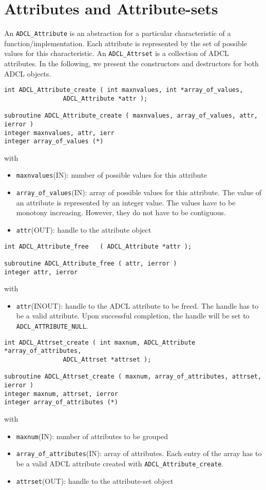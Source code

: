 \section{Attributes and Attribute-sets}

An {\tt ADCL\_Attribute} is an abstraction for a particular characteristic of a function/implementation. Each attribute is represented by the set of possible values for this characteristic.  An {\tt ADCL\_Attrset} is a collection of ADCL attributes.
In the following, we present the constructors and destructors for both ADCL objects.

\begin{verbatim}
int ADCL_Attribute_create ( int maxnvalues, int *array_of_values, 
			    ADCL_Attribute *attr );

subroutine ADCL_Attribute_create ( maxnvalues, array_of_values, attr, ierror )
integer maxnvalues, attr, ierr
integer array_of_values (*)
\end{verbatim}
with
\begin{itemize}
\item {\tt maxnvalues}(IN): number of possible values for this attribute
\item {\tt array\_of\_values}(IN): array of possible values for this attribute. The 
	value of an attribute is represented by an integer value. The values have to be 
	monotony increasing. However, they do not have to be contiguous.
\item {\tt attr}(OUT): handle to the attribute object
\end{itemize} 	


\begin{verbatim}
int ADCL_Attribute_free   ( ADCL_Attribute *attr );

subroutine ADCL_Attribute_free ( attr, ierror )
integer attr, ierror
\end{verbatim}
with
\begin{itemize}
\item {\tt attr}(INOUT): handle to the ADCL attribute to be freed. The handle has to be a valid attribute.
    	Upon successful completion, the handle will be set to {\tt ADCL\_ATTRIBUTE\_NULL}.
\end{itemize}



\begin{verbatim}
int ADCL_Attrset_create ( int maxnum, ADCL_Attribute *array_of_attributes, 
			    ADCL_Attrset *attrset );

subroutine ADCL_Attrset_create ( maxnum, array_of_attributes, attrset, ierror )
integer maxnum, attrset, ierror
integer array_of_attributes (*)
\end{verbatim}
with
\begin{itemize}
\item {\tt maxnum}(IN): number of attributes to be grouped
\item {\tt array\_of\_attributes}(IN): array of attributes. Each entry of the array has to be a 
	valid ADCL attribute created with {\tt ADCL\_Attribute\_create}.
\item {\tt attrset}(OUT): handle to the attribute-set object
\end{itemize}

